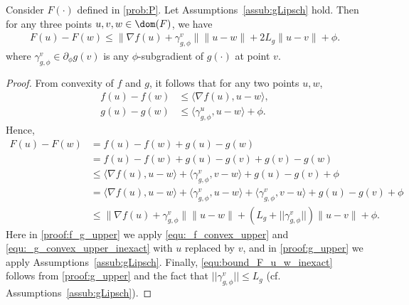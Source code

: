\documentclass[11pt]{article}
\numberwithin{equation}{section}
\begin{document}
\begin{lemma}
Consider $F(\cdot)$ defined in \eqref{prob:P}. Let Assumptions~\ref{assub:gLipsch} hold. Then for any three points $u, v, w \in \dom(F)$, we have
\begin{align}
	\label{equ:bound_F_u_w_inexact}
    F(u) - F(w) 
    \leq 
    \|\nabla f(u)+\gamma_{g, \phi}^v\|\|u-w\| + 2L_g \|u-v\| + \phi.
\end{align}
where $\gamma_{g, \phi}^v \in \partial_{\phi} g(v)$ is any $\phi$-subgradient of $g(\cdot)$ at point $v$.
\end{lemma}
\begin{proof}
	From convexity of $f$ and $g$, it follows that for any two points $u, w$,
	\begin{align}
		\label{equ:_f_convex_upper}
	    f(u) - f(w) &\leq \langle \nabla f(u), u-w \rangle, \\
	    \label{equ:_g_convex_upper_inexact}
	    g(u) - g(w) &\leq \langle \gamma_{g, \phi}^u, u-w \rangle + \phi.
	\end{align}
	Hence,
	\begin{align}
	    \nonumber
	    F(u)-F(w)
	    &=f(u)-f(w)+g(u)-g(w) \\
	    \nonumber
	    &=f(u)-f(w)+g(u)-g(v)+g(v)-g(w) \\
	    \label{proof:f_g_upper}
	    &\leq \langle \nabla f(u), u-w \rangle
	    +\langle \gamma_{g, \phi}^v, v-w \rangle 
	    +g(u)-g(v) 
	    + \phi\\
	    \nonumber
	    &= \langle \nabla f(u), u-w \rangle
	    +\langle \gamma_{g, \phi}^v, u-w \rangle 
	    +\langle \gamma_{g, \phi}^v, v-u \rangle 
	    +g(u)-g(v)
	    + \phi\\
	    \label{proof:g_upper}
	    &\leq \|\nabla f(u)+\gamma_{g, \phi}^v\|\|u-w\| 
	    + (L_g + ||\gamma_{g, \phi}^v||) \|u-v\|+ \phi. 
	\end{align}
	Here in \eqref{proof:f_g_upper} we apply \eqref{equ:_f_convex_upper} and \eqref{equ:_g_convex_upper_inexact} with $u$ replaced by $v$, and in \eqref{proof:g_upper} we apply Assumptions~\ref{assub:gLipsch}. Finally, \eqref{equ:bound_F_u_w_inexact} follows from \eqref{proof:g_upper} and the fact that $||\gamma_{g, \phi}^v|| \leq L_g$ (cf. Assumptions~\ref{assub:gLipsch}).
\end{proof}
\end{document}
